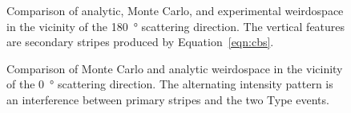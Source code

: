 \begin{figure}
\begin{center}
  \end{center}
  \caption{Comparison of analytic, Monte Carlo, and experimental weirdospace
    in the vicinity of the \SI{180}{\degree} scattering direction.  The
    vertical features are secondary stripes produced by Equation~\ref{eqn:cbs}.}
  \label{fig:scat180degree}
\end{figure}

\begin{figure}
  \centering
  \caption{Comparison of Monte Carlo and analytic weirdospace in the
    vicinity of the \SI{0}{\degree} scattering direction.  The alternating
    intensity pattern is an interference between primary stripes and the two
    Type  events.}
  \label{fig:scat0degree}
\end{figure}

